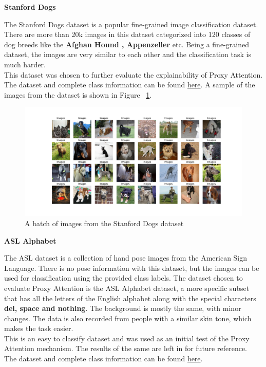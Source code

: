 \documentclass[a4paper,11pt,openright]{book}
\begin{document}
\textbf{Stanford Dogs}

The Stanford Dogs dataset \cite{khoslaNovelDatasetFineGrained} is a popular fine-grained image classification dataset. There are more than 20k images in this dataset categorized into  120 classes of dog breeds like the \textbf{Afghan Hound , Appenzeller} etc. Being a fine-grained dataset, the images are very similar to each other and the classification task is much harder.\\
This dataset was chosen to further evaluate the explainability of Proxy Attention.\\
The dataset and complete class information can be found \href{http://vision.stanford.edu/aditya86/ImageNetDogs/}{here}.
A sample of the images from the dataset is shown in Figure ~\ref{fig:dogs}.
\begin{figure}[!htb]
    \centering
    \includegraphics[width=1\textwidth]{images/dogs.pdf}
    \caption{A batch of images from the Stanford Dogs dataset}
    \label{fig:dogs}
\end{figure}

\textbf{ASL Alphabet}

The ASL dataset is a collection of hand pose images from the American Sign Language. There is no pose information with this dataset, but the images can be used for classification using the provided class labels.
The dataset chosen to evaluate Proxy Attention is the ASL Alphabet dataset, a more specific subset that has all the letters of the English alphabet along with the special characters \textbf{del, space and nothing}. The background is mostly the same, with minor changes. The data is also recorded from people with a similar skin tone, which makes the task easier.\\
This is an easy to classify dataset and was used as an initial test of the Proxy Attention mechanism. The results of the same are left in for future reference. \\
The dataset and complete class information can be found \href{https://www.kaggle.com/datasets/grassknoted/asl-alphabet}{here}.
\end{document}
